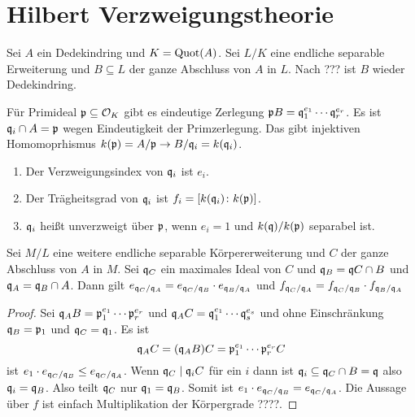 \chapter{Hilbert Verzweigungstheorie}
Sei \(A\) ein Dedekindring und \(K=\operatorname{Quot}(A)\). Sei \(L/K\) eine endliche separable Erweiterung und \(B\subseteq L\) der ganze Abschluss von \(A\) in \(L\). Nach ??? ist \(B\) wieder Dedekindring.

\begin{Def}Für Primideal \(\mathfrak{p}\subseteq \mathcal{O}_K\) gibt es eindeutige Zerlegung 
	\(\mathfrak{p} B=\mathfrak{q}_1^{e_1}\cdots \mathfrak{q}_r^{e_r}\).
	Es ist \(\mathfrak{q}_i\cap A=\mathfrak{p}\) wegen Eindeutigkeit der Primzerlegung.
	Das gibt injektiven Homomoprhismus \(k(\mathfrak{p})=A/\mathfrak{p}\to B/\mathfrak{q}_i=k(\mathfrak{q}_i)\).
	\begin{enumerate}
		\item 
		Der Verzweigungsindex von \(\mathfrak{q}_i\) ist \(e_i\).
		\item Der Trägheitsgrad von \(\mathfrak{q}_i\) ist \(f_i=[k(\mathfrak{q}_i)\colon k(\mathfrak{p})]\).
		\item \(\mathfrak{q}_i\) heißt unverzweigt über \(\mathfrak{p}\), wenn \(e_i=1\) und \(k(\mathfrak{q})/k(\mathfrak{p})\) separabel ist.
	\end{enumerate}
	
\end{Def}
\begin{Lemma}
	Sei \(M/L\) eine weitere endliche separable Körpererweiterung und \(C\) der ganze Abschluss von \(A\) in \(M\). Sei \(\mathfrak{q}_C\) ein maximales Ideal von \(C\)
	und \(\mathfrak{q}_B=\mathfrak{q} C\cap B\) und \(\mathfrak{q}_A=\mathfrak{q}_B\cap A\).
	Dann gilt 
	\(e_{\mathfrak{q}_C/\mathfrak{q}_A}=e_{\mathfrak{q}_C/\mathfrak{q}_B}\cdot e_{\mathfrak{q}_B/\mathfrak{q}_A}\) und \(f_{\mathfrak{q}_C/\mathfrak{q}_A}=f_{\mathfrak{q}_C/\mathfrak{q}_B}\cdot f_{\mathfrak{q}_B/\mathfrak{q}_A}\)
\end{Lemma}
\begin{proof}
	Sei \(\mathfrak{q}_AB=\mathfrak{p}_1^{e_1}\cdots \mathfrak{p}_r^{e_r}\)
	und \(\mathfrak{q}_AC=\mathfrak{q}_1^{e_1}\cdots \mathfrak{q}_s^{e_s}\)
	und ohne Einschränkung \(\mathfrak{q}_B=\mathfrak{p}_1\) und \(\mathfrak{q}_C=\mathfrak{q}_1\).
	Es ist
	\[\mathfrak{q}_AC=(\mathfrak{q}_AB)C=\mathfrak{p}_1^{e_1}\cdots \mathfrak{p}_r^{e_r}C\] ist \(e_1\cdot e_{\mathfrak{q}_C/\mathfrak{q}_B}\leq e_{\mathfrak{q}_C/\mathfrak{q}_A}\).
	Wenn \(\mathfrak{q}_C\mid \mathfrak{q}_iC\) für ein \(i\) dann ist
	\(\mathfrak{q}_i\subseteq \mathfrak{q}_C\cap B=\mathfrak{q}\) also \(\mathfrak{q}_i=\mathfrak{q}_B\).
	Also teilt \(\mathfrak{q}_C\) nur \(\mathfrak{q}_1=\mathfrak{q}_B\).
	Somit ist \(e_1\cdot e_{\mathfrak{q}_C/\mathfrak{q}_B}= e_{\mathfrak{q}_C/\mathfrak{q}_A}\).
	Die Aussage über \(f\) ist einfach Multiplikation der Körpergrade ????.
\end{proof}

